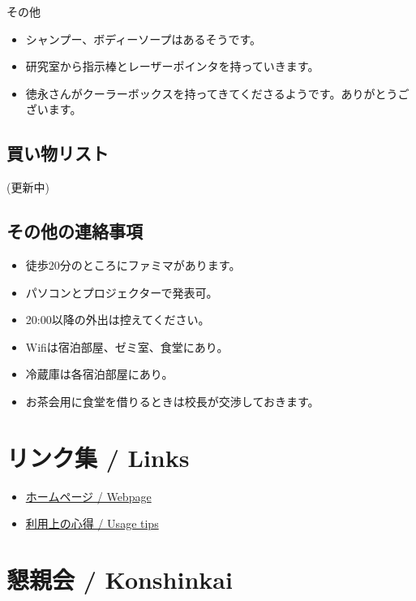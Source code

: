 \documentclass[unicode,a4paper,11pt]{ltjsarticle}
\begin{document}
その他

\begin{itemize}
  \item
        シャンプー、ボディーソープはあるそうです。
  \item
        研究室から指示棒とレーザーポインタを持っていきます。
  \item
        徳永さんがクーラーボックスを持ってきてくださるようです。ありがとうございます。
\end{itemize}

\subsection*{買い物リスト}

(更新中)

\subsection*{その他の連絡事項}

\begin{itemize}
  \item
        徒歩20分のところにファミマがあります。
  \item
        パソコンとプロジェクターで発表可。
  \item
        20:00以降の外出は控えてください。
  \item
        Wifiは宿泊部屋、ゼミ室、食堂にあり。
  \item
        冷蔵庫は各宿泊部屋にあり。
  \item
        お茶会用に食堂を借りるときは校長が交渉しておきます。
\end{itemize}


\section{リンク集 / Links}

\begin{itemize}
  \item
        \href{https://www.waseda.jp/inst/student/facility/seminar/facility/izukawana}{ホームページ / Webpage}
  \item
        \href{https://www.waseda.jp/inst/student/facility/seminar/flow/tips}{利用上の心得 / Usage tips}
\end{itemize}


\section{懇親会 / Konshinkai}
\end{document}
